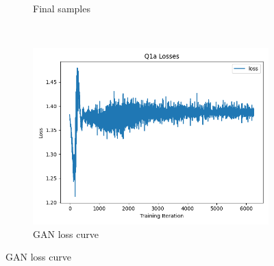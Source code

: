 \documentclass{article}
\begin{document}
\begin{enumerate}[(a)]
\begin{figure}[H]
\begin{subfigure}{0.45\textwidth}
        \caption{Final samples}
    \end{subfigure}
    \\
    \begin{subfigure}{0.34\textwidth}
        \centering
        \includegraphics[width=\textwidth]{figures/q1a_losses.png}
        \caption{GAN loss curve}
    \end{subfigure}
\end{figure}
\newpage


\end{enumerate}
\end{document}
